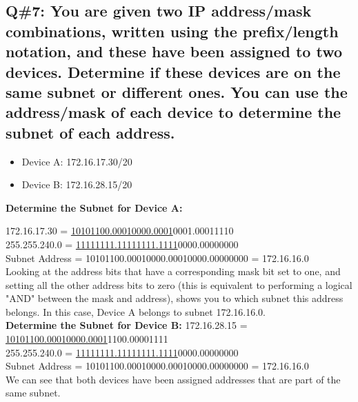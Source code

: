 \subsection*{Q\#7: You are given two IP address/mask combinations, written using the prefix/length notation, and these have been assigned to two devices. Determine if these devices are on the same subnet or different ones. You can use the address/mask of each device to determine the subnet of each address.}
\begin{itemize}
\item Device A: 172.16.17.30/20
\item Device B: 172.16.28.15/20
\end{itemize}

\textbf{Determine the Subnet for Device A:}

172.16.17.30  = \underline{10101100.00010000.0001}0001.00011110 \\
255.255.240.0 = \underline{11111111.11111111.1111}0000.00000000 \\
Subnet Address = 10101100.00010000.00010000.00000000 = 172.16.16.0 \\
Looking at the address bits that have a corresponding mask bit set to one, and setting all the other address bits to zero (this is equivalent to performing a logical "AND" between the mask and address), shows you to which subnet this address belongs. In this case, Device A belongs to subnet 172.16.16.0. \\
\textbf{Determine the Subnet for Device B:}
172.16.28.15  = \underline{10101100.00010000.0001}1100.00001111 \\
255.255.240.0 = \underline{11111111.11111111.1111}0000.00000000 \\
Subnet Address = 10101100.00010000.00010000.00000000 = 172.16.16.0 \\
We can see that both devices have been assigned addresses that are part of the same subnet.
